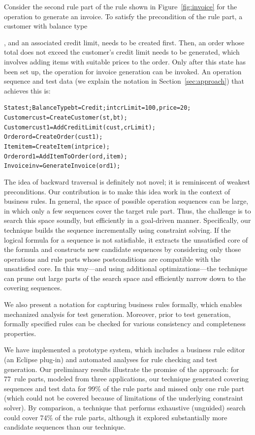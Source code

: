 Consider the second rule part of the rule shown in Figure~\ref{fig:invoice} for
the operation to generate an invoice. To satisfy the precondition of the rule
part, a customer with balance type \subject{Credit}, and an associated credit
limit, needs to be created first. Then, an order whose total does not exceed the
customer's credit limit needs to be generated, which involves adding items with
suitable prices to the order. Only after this state has been set up, the
operation for invoice generation can be invoked. An operation sequence and test
data (we explain the notation in Section~\ref{sec:approach}) that achieves this
is:

\vspace*{-4pt}%
{\scriptsize
\begin{alltt}
 State st; BalanceType bt = Credit; int crLimit = 100, price = 20;
 Customer cust = CreateCustomer(st, bt);
 Customer cust1 = AddCreditLimit(cust, crLimit);
 Order ord = CreateOrder(cust1);
 Item item = CreateItem(int price);
 Order ord1 = AddItemToOrder(ord, item);
 Invoice inv = GenerateInvoice(ord1);  
\end{alltt}}%
\vspace*{-5pt}

The idea of backward traversal is definitely not novel; it is reminiscent of
weakest preconditions.  Our contribution is to make this idea work in the
context of business rules.  In general, the space of possible operation
sequences can be large, in which only a few sequences cover the target rule
part. Thus, the challenge is to search this space soundly, but efficiently in a
goal-driven manner. Specifically, our technique builds the sequence
incrementally using constraint solving. If the logical formula for a sequence is
not satisfiable, it extracts the unsatisfied core of the formula and constructs
new candidate sequences by considering only those operations and rule parts
whose postconditions are compatible with the unsatisfied core. In this way---and
using additional optimizations---the technique can prune out large parts of the
search space and efficiently narrow down to the covering sequences.

We also present a notation for capturing business rules formally, which enables
mechanized analysis for test generation. Moreover, prior to test generation,
formally specified rules can be checked for various consistency and completeness
properties.

We have implemented a prototype system, which includes a business rule editor
(an Eclipse plug-in) and automated analyses for rule checking and test
generation. Our preliminary results illustrate the promise of the approach: for
77~rule parts, modeled from three applications, our technique generated covering
sequences and test data for 99\% of the rule parts and missed only one rule part
(which could not be covered because of limitations of the underlying constraint
solver). By comparison, a technique that performs exhaustive (unguided) search
could cover 74\% of the rule parts, although it explored substantially more
candidate sequences than our technique.

